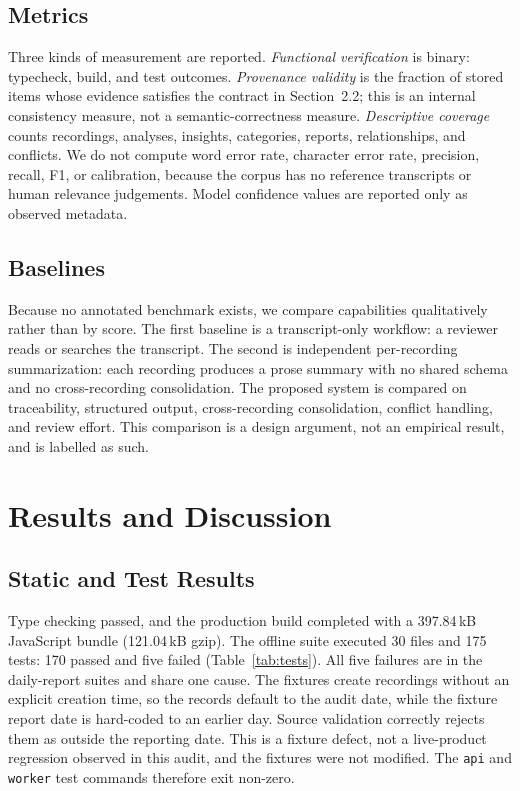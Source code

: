 \documentclass[10pt,a4paper]{article}
\newcommand{\code}[1]{\texttt{#1}}
\begin{document}
\subsection{Metrics}

Three kinds of measurement are reported. \emph{Functional verification} is binary:
typecheck, build, and test outcomes. \emph{Provenance validity} is the fraction of stored
items whose evidence satisfies the contract in Section~2.2; this is an internal
consistency measure, not a semantic-correctness measure. \emph{Descriptive coverage}
counts recordings, analyses, insights, categories, reports, relationships, and conflicts.
We do not compute word error rate, character error rate, precision, recall, F1, or
calibration, because the corpus has no reference transcripts or human relevance
judgements. Model confidence values are reported only as observed metadata.

\subsection{Baselines}

Because no annotated benchmark exists, we compare capabilities qualitatively rather than
by score. The first baseline is a transcript-only workflow: a reviewer reads or searches
the transcript. The second is independent per-recording summarization: each recording
produces a prose summary with no shared schema and no cross-recording consolidation. The
proposed system is compared on traceability, structured output, cross-recording
consolidation, conflict handling, and review effort. This comparison is a design argument,
not an empirical result, and is labelled as such.

\section{Results and Discussion}

\subsection{Static and Test Results}

Type checking passed, and the production build completed with a 397.84\,kB JavaScript
bundle (121.04\,kB gzip). The offline suite executed 30 files and 175 tests: 170 passed and
five failed (Table~\ref{tab:tests}). All five failures are in the daily-report suites and
share one cause. The fixtures create recordings without an explicit creation time, so the
records default to the audit date, while the fixture report date is hard-coded to an
earlier day. Source validation correctly rejects them as outside the reporting date. This
is a fixture defect, not a live-product regression observed in this audit, and the fixtures
were not modified. The \code{api} and \code{worker} test commands therefore exit non-zero.
\end{document}
